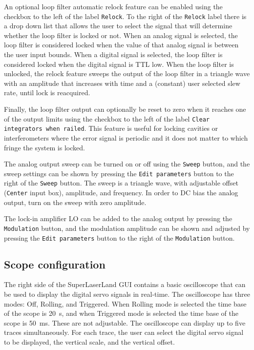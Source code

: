 \documentclass[aip,rsi,preprint,graphicx]{revtex4-1}
\begin{document}
An optional loop filter automatic relock feature can be enabled using the checkbox to the left of the label {\tt Relock}.  To the right of the {\tt Relock} label there is a drop down list that allows the user to select the signal that will determine whether the loop filter is locked or not.  When an analog signal is selected, the loop filter is considered locked when the value of that analog signal is between the user input bounds.  When a digital signal is selected, the loop filter is considered locked when the digital signal is TTL low.  When the loop filter is unlocked, the relock feature sweeps the output of the loop filter in a triangle wave with an amplitude that increases with time and a (constant) user selected slew rate, until lock is reacquired.

Finally, the loop filter output can optionally be reset to zero when it reaches one of the output limits using the checkbox to the left of the label {\tt Clear integrators when railed}.  This feature is useful for locking cavities or interferometers where the error signal is periodic and it does not matter to which fringe the system is locked.

The analog output sweep can be turned on or off using the {\tt Sweep} button, and the sweep settings can be shown by pressing the {\tt Edit parameters} button to the right of the {\tt Sweep} button.  The sweep is a triangle wave, with adjustable offset ({\tt Center} input box), amplitude, and frequency.  In order to DC bias the analog output, turn on the sweep with zero amplitude.

The lock-in amplifier LO can be added to the analog output by pressing the {\tt Modulation} button, and the modulation amplitude can be shown and adjusted by pressing the {\tt Edit parameters} button to the right of the {\tt Modulation} button.

\subsection{Scope configuration}

The right side of the SuperLaserLand GUI contains a basic oscilloscope that can be used to display the digital servo signals in real-time.  The oscilloscope has three modes: Off, Rolling, and Triggered.  When Rolling mode is selected the time base of the scope is 20~s, and when Triggered mode is selected the time base of the scope is 50~ms.  These are not adjustable.  The oscilloscope can display up to five traces simultaneously.  For each trace, the user can select the digital servo signal to be displayed, the vertical scale, and the vertical offset.
\end{document}
